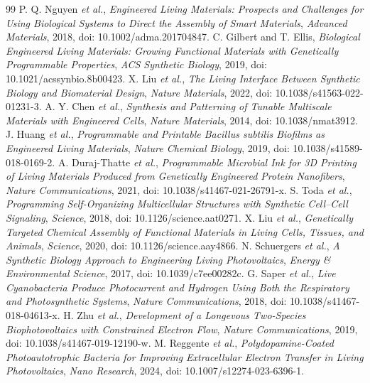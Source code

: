 \documentclass[conference]{IEEEtran}
\begin{document}
\begin{thebibliography}{99}
 P. Q. Nguyen \emph{et al.}, \emph{Engineered Living Materials: Prospects and Challenges for Using Biological Systems to Direct the Assembly of Smart Materials}, \emph{Advanced Materials}, 2018, doi: 10.1002/adma.201704847.
 C. Gilbert and T. Ellis, \emph{Biological Engineered Living Materials: Growing Functional Materials with Genetically Programmable Properties}, \emph{ACS Synthetic Biology}, 2019, doi: 10.1021/acssynbio.8b00423.
 X. Liu \emph{et al.}, \emph{The Living Interface Between Synthetic Biology and Biomaterial Design}, \emph{Nature Materials}, 2022, doi: 10.1038/s41563-022-01231-3.
 A. Y. Chen \emph{et al.}, \emph{Synthesis and Patterning of Tunable Multiscale Materials with Engineered Cells}, \emph{Nature Materials}, 2014, doi: 10.1038/nmat3912.
 J. Huang \emph{et al.}, \emph{Programmable and Printable Bacillus subtilis Biofilms as Engineered Living Materials}, \emph{Nature Chemical Biology}, 2019, doi: 10.1038/s41589-018-0169-2.
 A. Duraj-Thatte \emph{et al.}, \emph{Programmable Microbial Ink for 3D Printing of Living Materials Produced from Genetically Engineered Protein Nanofibers}, \emph{Nature Communications}, 2021, doi: 10.1038/s41467-021-26791-x.
 S. Toda \emph{et al.}, \emph{Programming Self-Organizing Multicellular Structures with Synthetic Cell--Cell Signaling}, \emph{Science}, 2018, doi: 10.1126/science.aat0271.
 X. Liu \emph{et al.}, \emph{Genetically Targeted Chemical Assembly of Functional Materials in Living Cells, Tissues, and Animals}, \emph{Science}, 2020, doi: 10.1126/science.aay4866.
 N. Schuergers \emph{et al.}, \emph{A Synthetic Biology Approach to Engineering Living Photovoltaics}, \emph{Energy \& Environmental Science}, 2017, doi: 10.1039/c7ee00282c.
 G. Saper \emph{et al.}, \emph{Live Cyanobacteria Produce Photocurrent and Hydrogen Using Both the Respiratory and Photosynthetic Systems}, \emph{Nature Communications}, 2018, doi: 10.1038/s41467-018-04613-x.
 H. Zhu \emph{et al.}, \emph{Development of a Longevous Two-Species Biophotovoltaics with Constrained Electron Flow}, \emph{Nature Communications}, 2019, doi: 10.1038/s41467-019-12190-w.
 M. Reggente \emph{et al.}, \emph{Polydopamine-Coated Photoautotrophic Bacteria for Improving Extracellular Electron Transfer in Living Photovoltaics}, \emph{Nano Research}, 2024, doi: 10.1007/s12274-023-6396-1.

\end{thebibliography}
\end{document}
